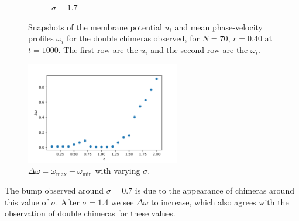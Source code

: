\documentclass[a4paper,12pt]{article}
\begin{document}
\begin{figure}[H]
\begin{subfigure}{.32\textwidth}
  \caption{$\sigma = 1.7$}
\end{subfigure}
\caption{Snapshots of the membrane potential $u_i$ and mean phase-velocity profiles $\omega_i$ for the double chimeras observed, for $N=70$, $r=0.40$ at $t=1000$. The first row are the $u_i$ and the second row are the $\omega_i$.}
\label{dchim}
\end{figure}

\begin{figure}[H]
\centering
\includegraphics[width=0.6\textwidth]{deltaw.png}
\caption{$\Delta \omega = \omega_{\text{max}}-\omega_{\text{min}}$ with varying $\sigma$.}
\label{dchim2}
\end{figure}
\noindent The bump observed around $\sigma=0.7$ is due to the appearance of chimeras around this value of $\sigma$. After $\sigma = 1.4$ we see $\Delta \omega$ to increase, which also agrees with the observation of double chimeras for these values.
\end{document}
